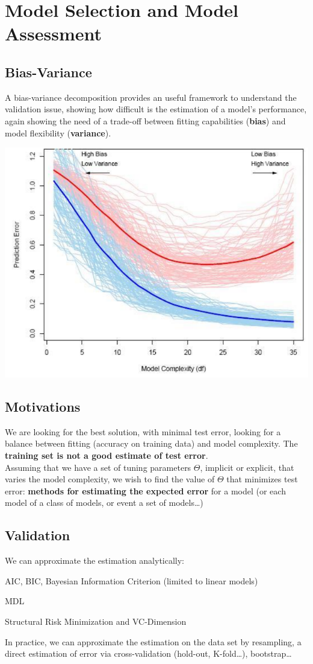 \documentclass[10pt]{report}
\begin{document}
\section{Model Selection and Model Assessment}
\subsection{Bias-Variance} A bias-variance decomposition provides an useful framework to understand the validation issue, showing how difficult is the estimation of a model's performance, again showing the need of a trade-off between fitting capabilities (\textbf{bias}) and model flexibility (\textbf{variance}).
\begin{center}
	\includegraphics[scale=0.75]{10.png}
\end{center}
\subsection{Motivations} We are looking for the best solution, with minimal test error, looking for a balance between fitting (accuracy on training data) and model complexity. The \textbf{training set is not a good estimate of test error}.\\
Assuming that we have a set of tuning parameters $\Theta$, implicit or explicit, that varies the model complexity, we wish to find the value of $\Theta$ that minimizes test error: \textbf{methods for estimating the expected error} for a model (or each model of a class of models, or event a set of models\ldots)
\subsection{Validation}
We can approximate the estimation analytically:
\begin{list}{}{}
	\item AIC, BIC, Bayesian Information Criterion (limited to linear models)
	\item MDL
	\item Structural Risk Minimization and VC-Dimension
\end{list}
In practice, we can approximate the estimation on the data set by resampling, a direct estimation of error via cross-validation (hold-out, K-fold\ldots), bootstrap\ldots
\end{document}
